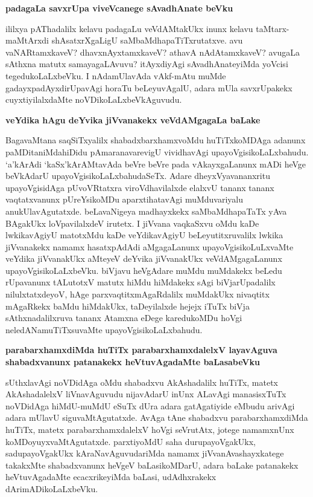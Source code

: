 \eject

{\bigskip
\noindent
{\large\bf padagaLa savxrUpa viveVcanege sAvadhAnate beVku}}\label{page191}
\medskip

\noindent
ililxya pAThadalilx kelavu padagaLu veVdAMtakUkx inunx kelavu taMtarx-maMtArxdi shAsatxrXgaLigU saMbaMdha\-paTiTxrutatxve. avu vaNARtamxkaveV? dhavxnAyxtamxkaveV? athavA nAdAtamxkaveV? avugaLa sAthxna matutx samaya\-gaLAvuvu? itAyxdiyAgi sAvadhAnateyiMda yoVcisi tegedukoLaLxbeVku. I nAdamUlavAda vAkf-mAtu muMde gadayxpadAyxdirUpavAgi horaTu beLeyuvAgalU, adara mUla savxrUpakekx cuyxtiyilalxdaMte noVDikoLaLxbeVkAguvudu.

{\bigskip
\noindent
{\large\bf veYdika hAgu deYvika jiVvanakekx veVdAMgagaLa baLake}}\label{page191}
\medskip

\noindent
BagavaMtana saqSiTxyalilx shabadxbarxhamxvoMdu huTiTxkoMDAga adanunx paMDitaniMda\break hiDidu pAmaranavare\-vigU vividhavAgi upayoVgisikoLaLxbahudu. `a'kArAdi `kaSx'kArAMtavAda beVre beVre pada vAkayx\-gaLanunx mADi heVge beVkAdarU upa\break\-yoVgisikoLaLxbahudaSeTx. Adare dheyxVyavananxritu upayoVgisi\-dAga pUvoVR\-tatxra viroVdhavilalxde elalxvU tananx tananx vaqtatxvanunx pUreYsikoMDu aparxtihatavAgi muMdu\-variyalu anukUlavAgutatxde. beLavaNigeya madhayxkekx saMbaMdhapaTaTx yAva BAgakUkx loVpavilalxdeV irutetx. I jiVvana vaqkaSxvu oMdu kaDe lwkikavAgiyU matotxMdu kaDe veYdikavAgiyU beLeyu\-titxruvalilx lwkika jiVvanakekx namamx hasatx\break\-pAdAdi aMgagaLanunx upayoVgisikoLuLxvaMte veYdika jiVvanakUkx aMteyeV deYvika jiVvanakUkx veVdAMgagaLanunx upayoVgisikoLaLxbeVku. biVjavu heVgAdare muMdu muMdakekx beLedu rUpavanunx tALutotxV matutx hiMdu hiMdakekx sAgi biVja\-rUpa\-dalilx nilulxtatxdeyoV, hAge parxvaqtitxmAgaRdalilx muMdakUkx nivaqtitx mAgaRkekx baMdu hiMdakUkx, taDeyilalxde hejejx iTuTx biVja sAthxna\-dalilxruva tananx Atamxna eDege karedu\-koMDu hoVgi neledANamuTiTxsuvaMte upayoVgisikoLaLxbahudu.

{\bigskip
\noindent
{\large\bf parabarxhamxdiMda huTiTx parabarxhamxdalelxV layavAguva shabadxvanunx patanakekx heVtuvAgadaMte baLasabeVku}}\label{page193}
\medskip

\noindent
sUthxlavAgi noVDidAga oMdu shabadxvu AkAshadalilx huTiTx, matetx AkAshadalelxV liVna\-vAguvudu nija\-vAdarU inUnx ALavAgi manasisxTuTx noVDidAga hiMdU\break-muMdU eSuTx dUra adara gatAgatiyide eMbudu arivAgi adara mUlavU siguvaMtAgutatxde. AvAga tAne shabadxvu parabarxhamxdiMda huTiTx, matetx parabarxhamxdalelxV hoVgi seVrutAtx, jotege namamxnUnx koMDoyuyxvaMtAgutatxde. parxtiyoMdU saha durupayoVgakUkx, sadupayoVgakUkx kAraNavAguvudariMda namamx jiVvanAvashayxkatege takakxMte shabadx\-vanunx heVgeV baLasikoMDarU, adara baLake patanakekx heVtuvAgadaMte ecacxrikeyiMda baLasi, udAdhxrakekx dAri\-mADikoLaLxbeVku.

